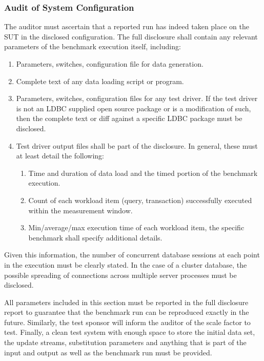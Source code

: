 \subsubsection{Audit of System Configuration}
The auditor must ascertain that a reported run has indeed taken place on the SUT in the disclosed configuration.
The full disclosure shall contain any relevant parameters of the benchmark execution itself, including:
\begin{enumerate}
    \item Parameters, switches, configuration file for data generation.
    \item Complete text of any data loading script or program.
    \item Parameters, switches, configuration files for any test driver. If the test driver is not an LDBC supplied open source package or is a modification of such, then the complete text or diff against a specific LDBC package must be disclosed.
    \item Test driver output files shall be part of the disclosure. In general, these must at least detail the following:
          \begin{enumerate}[label=\roman*)]
              \item Time and duration of data load and the timed portion of the benchmark execution.
              \item Count of each workload item (\eg query, transaction) successfully executed within the measurement window.
              \item Min/average/max execution time of each workload item, the specific benchmark shall specify additional details.
          \end{enumerate}
\end{enumerate}

Given this information, the number of concurrent database sessions at each point in the execution must be clearly stated. In the case of a cluster database, the possible spreading of connections across multiple server processes must be disclosed.


All parameters included in this section must be reported in the full disclosure report to guarantee that the benchmark run can be reproduced exactly in the future. Similarly, the test sponsor will inform the auditor of the scale factor to test. Finally, a clean test system with enough space to store the initial data set, the update streams, substitution parameters and anything that is part of the input and output as well as the benchmark run must be provided.

